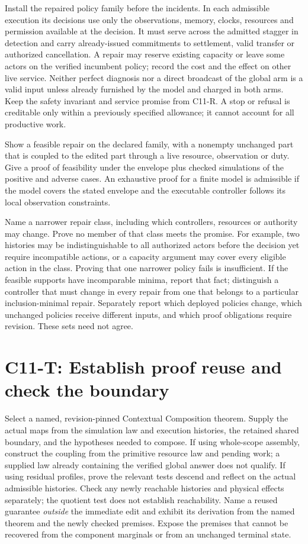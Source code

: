 \documentclass[11pt]{article}
\begin{document}
Install the repaired policy family before the incidents. In each admissible execution its decisions use only the observations, memory, clocks, resources and permission available at the decision. It must serve across the admitted stagger in detection and carry already-issued commitments to settlement, valid transfer or authorized cancellation. A repair may reserve existing capacity or leave some actors on the verified incumbent policy; record the cost and the effect on other live service. Neither perfect diagnosis nor a direct broadcast of the global arm is a valid input unless already furnished by the model and charged in both arms. Keep the safety invariant and service promise from C11-R. A stop or refusal is creditable only within a previously specified allowance; it cannot account for all productive work.

Show a feasible repair on the declared family, with a nonempty unchanged part that is coupled to the edited part through a live resource, observation or duty. Give a proof of feasibility under the envelope plus checked simulations of the positive and adverse cases. An exhaustive proof for a finite model is admissible if the model covers the stated envelope and the executable controller follows its local observation constraints.

Name a narrower repair class, including which controllers, resources or authority may change. Prove no member of that class meets the promise. For example, two histories may be indistinguishable to all authorized actors before the decision yet require incompatible actions, or a capacity argument may cover every eligible action in the class. Proving that one narrower policy fails is insufficient. If the feasible supports have incomparable minima, report that fact; distinguish a controller that must change in every repair from one that belongs to a particular inclusion-minimal repair. Separately report which deployed policies change, which unchanged policies receive different inputs, and which proof obligations require revision. These sets need not agree.

\section{C11-T: Establish proof reuse and check the boundary}

Select a named, revision-pinned Contextual Composition theorem. Supply the actual maps from the simulation law and execution histories, the retained shared boundary, and the hypotheses needed to compose. If using whole-scope assembly, construct the coupling from the primitive resource law and pending work; a supplied law already containing the verified global answer does not qualify. If using residual profiles, prove the relevant tests descend and reflect on the actual admissible histories. Check any newly reachable histories and physical effects separately; the quotient test does not establish reachability. Name a reused guarantee \emph{outside} the immediate edit and exhibit its derivation from the named theorem and the newly checked premises. Expose the premises that cannot be recovered from the component marginals or from an unchanged terminal state.
\end{document}
